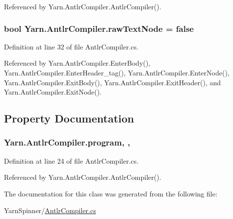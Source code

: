 Referenced by Yarn.\-Antlr\-Compiler.\-Antlr\-Compiler().

\hypertarget{a00038_ac72e8a2a8207103d34b3d564e78fae93}{
\subsubsection[{raw\-Text\-Node}]{\setlength{\rightskip}{0pt plus 5cm}bool Yarn.\-Antlr\-Compiler.\-raw\-Text\-Node = false\hspace{0.3cm}{\ttfamily [package]}}}\label{a00038_ac72e8a2a8207103d34b3d564e78fae93}


Definition at line 32 of file Antlr\-Compiler.\-cs.



Referenced by Yarn.\-Antlr\-Compiler.\-Enter\-Body(), Yarn.\-Antlr\-Compiler.\-Enter\-Header\-\_\-tag(), Yarn.\-Antlr\-Compiler.\-Enter\-Node(), Yarn.\-Antlr\-Compiler.\-Exit\-Body(), Yarn.\-Antlr\-Compiler.\-Exit\-Header(), and Yarn.\-Antlr\-Compiler.\-Exit\-Node().



\subsection{Property Documentation}
\hypertarget{a00038_aa30773708afdaeded2e85e6c8a8e041e}{
\subsubsection[{program}]{ Yarn.\-Antlr\-Compiler.\-program\hspace{0.3cm}{\ttfamily [get]}, {\ttfamily [set]}, {\ttfamily [package]}}}\label{a00038_aa30773708afdaeded2e85e6c8a8e041e}


Definition at line 24 of file Antlr\-Compiler.\-cs.



Referenced by Yarn.\-Antlr\-Compiler.\-Antlr\-Compiler().



The documentation for this class was generated from the following file\-:\begin{DoxyCompactItemize}
\item 
Yarn\-Spinner/\hyperlink{a00303}{Antlr\-Compiler.\-cs}\end{DoxyCompactItemize}
